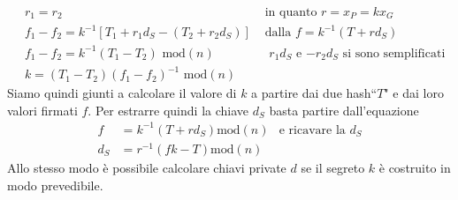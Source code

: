 \documentclass[a4paper,12pt]{tesiinfo}
\begin{document}
\begin{align*}
   &r_1 = r_2 &\text{ in quanto $r = x_P = kx_G$}\\
   &f_1 - f_2 = k^{-1} [T_1+r_1d_S - (T_2 + r_2d_S)] &\text{ dalla $f = k^{-1} (T+rd_S)$}\\
   &f_1 - f_2 = k^{-1} (T_1 - T_2) \text{ mod$(n)$} &\text{ $r_1d_S$ e $-r_2d_S$ si sono semplificati}\\
   &k= (T_1 - T_2)(f_1 - f_2)^{-1} \text{ mod$(n)$}
\end{align*}
Siamo quindi giunti a calcolare il valore di $k$ a partire dai due hash``$T$" e dai loro valori firmati $f$. Per estrarre quindi la chiave $d_S$ basta partire dall'equazione
\begin{align*}
   f &= k^{-1}(T+rd_S) \text{mod}(n) &\text{e ricavare la } d_S\\
   d_S &= r^{-1}(fk-T) \text{mod}(n) 
\end{align*}
Allo stesso modo \`e possibile calcolare chiavi private $d$ se il segreto $k$ \`e costruito in modo prevedibile.
%
%
%
%
%
%
%
%
%
%
%
%
%
%
%
\end{document}
